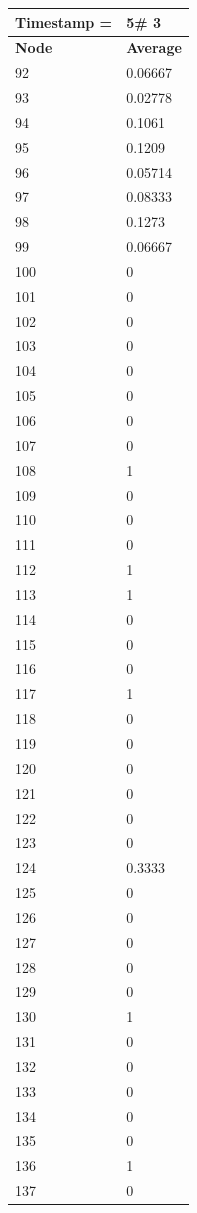 \begin{tabular}{|l||l|}
\hline
\textbf{Timestamp =} & \textbf{5}\# 3\\\hline
	\textbf{Node} & \textbf{Average} \\ \hline
\hline
	92 & 0.06667 \\ \hline
	93 & 0.02778 \\ \hline
	94 & 0.1061 \\ \hline
	95 & 0.1209 \\ \hline
	96 & 0.05714 \\ \hline
	97 & 0.08333 \\ \hline
	98 & 0.1273 \\ \hline
	99 & 0.06667 \\ \hline
	100 & 0 \\ \hline
	101 & 0 \\ \hline
	102 & 0 \\ \hline
	103 & 0 \\ \hline
	104 & 0 \\ \hline
	105 & 0 \\ \hline
	106 & 0 \\ \hline
	107 & 0 \\ \hline
	108 & 1 \\ \hline
	109 & 0 \\ \hline
	110 & 0 \\ \hline
	111 & 0 \\ \hline
	112 & 1 \\ \hline
	113 & 1 \\ \hline
	114 & 0 \\ \hline
	115 & 0 \\ \hline
	116 & 0 \\ \hline
	117 & 1 \\ \hline
	118 & 0 \\ \hline
	119 & 0 \\ \hline
	120 & 0 \\ \hline
	121 & 0 \\ \hline
	122 & 0 \\ \hline
	123 & 0 \\ \hline
	124 & 0.3333 \\ \hline
	125 & 0 \\ \hline
	126 & 0 \\ \hline
	127 & 0 \\ \hline
	128 & 0 \\ \hline
	129 & 0 \\ \hline
	130 & 1 \\ \hline
	131 & 0 \\ \hline
	132 & 0 \\ \hline
	133 & 0 \\ \hline
	134 & 0 \\ \hline
	135 & 0 \\ \hline
	136 & 1 \\ \hline
	137 & 0 \\ \hline
\end{tabular}

